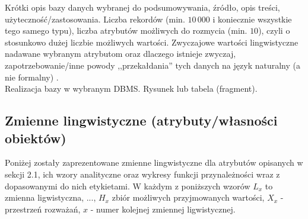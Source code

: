 \documentclass{article}
\begin{document}
Krótki opis bazy danych wybranej do podsumowywania, źródło, opis treści,
użyteczność/zastosowania. Liczba rekordów (min. $10\,000$ i koniecznie wszystkie tego
samego typu), liczba atrybutów możliwych do rozmycia (min. $10$), czyli o stosunkowo dużej
liczbie możliwych wartości. Zwyczajowe wartości lingwistyczne nadawane wybranym
atrybutom oraz dlaczego istnieje zwyczaj, zapotrzebowanie/inne powody
,,przekałdania'' tych danych na język
naturalny (a nie formalny) \cite{niewiadomski19, niewiadomski08}.\\
Realizacja bazy w wybranym DBMS. Rysunek lub tabela (fragment).

\subsection{Zmienne lingwistyczne (atrybuty/własności obiektów)}
Poniżej zostały zaprezentowane zmienne lingwistyczne dla atrybutów opisanych w sekcji 2.1, ich wzory analityczne oraz wykresy funkcji przynależności wraz z dopasowanymi do nich etykietami. W każdym z poniższych wzorów \(L_x\) to zmienna ligwistyczna, ..., \(H_x\) zbiór możliwych przyjmowanych wartości, \(X_x\) - przestrzeń rozważań, \(x\) - numer kolejnej zmiennej ligwistycznej. 
\end{document}
